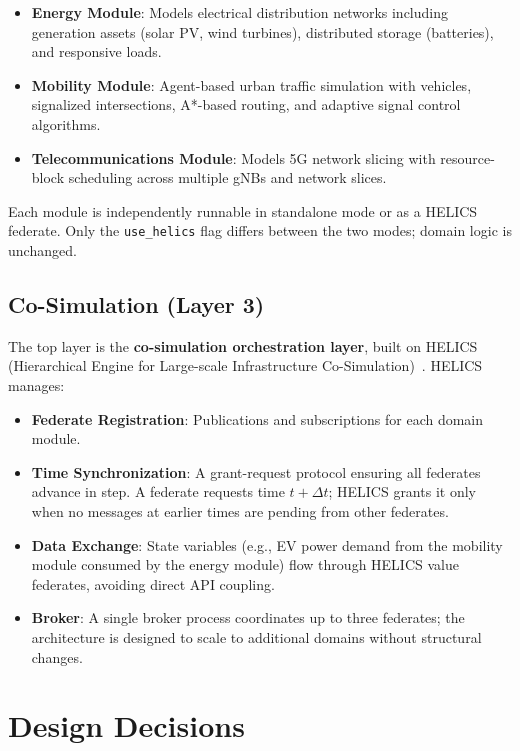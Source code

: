 \begin{itemize}
    \item \textbf{Energy Module}: Models electrical distribution networks including generation assets (solar PV, wind turbines), distributed storage (batteries), and responsive loads.
    \item \textbf{Mobility Module}: Agent-based urban traffic simulation with vehicles, signalized intersections, A*-based routing, and adaptive signal control algorithms.
    \item \textbf{Telecommunications Module}: Models 5G network slicing with resource-block scheduling across multiple gNBs and network slices.
\end{itemize}

Each module is independently runnable in standalone mode or as a HELICS federate. Only the \texttt{use\_helics} flag differs between the two modes; domain logic is unchanged.

\subsection{Co-Simulation (Layer 3)}

The top layer is the \textbf{co-simulation orchestration layer}, built on HELICS (Hierarchical Engine for Large-scale Infrastructure Co-Simulation)~\cite{helics}. HELICS manages:

\begin{itemize}
    \item \textbf{Federate Registration}: Publications and subscriptions for each domain module.
    \item \textbf{Time Synchronization}: A grant-request protocol ensuring all federates advance in step. A federate requests time $t + \Delta t$; HELICS grants it only when no messages at earlier times are pending from other federates.
    \item \textbf{Data Exchange}: State variables (e.g., EV power demand from the mobility module consumed by the energy module) flow through HELICS value federates, avoiding direct API coupling.
    \item \textbf{Broker}: A single broker process coordinates up to three federates; the architecture is designed to scale to additional domains without structural changes.
\end{itemize}


\section{Design Decisions}

